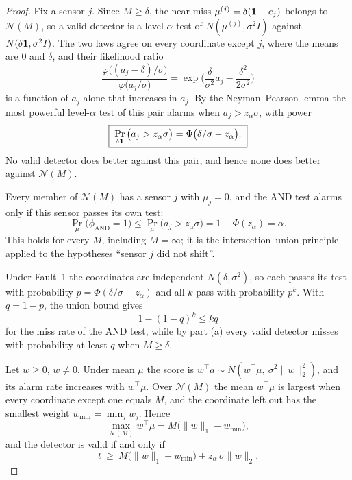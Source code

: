 \begin{proof}
 Fix a sensor $j$. Since $M\ge\delta$, the near-miss $\mu^{(j)}=\delta(\mathbf{1}-e_j)$ belongs to $\mathcal N(M)$, so a valid detector is a level-$\alpha$ test of $N(\mu^{(j)},\sigma^2I)$ against $N(\delta\mathbf{1},\sigma^2I)$. The two laws agree on every coordinate except $j$, where the means are $0$ and $\delta$, and their likelihood ratio
\begin{equation}\label{eq:nm-ratio}
  \frac{\varphi\big((a_j-\delta)/\sigma\big)}{\varphi\big(a_j/\sigma\big)}
  =\exp\Big(\frac{\delta}{\sigma^2}a_j-\frac{\delta^2}{2\sigma^2}\Big)
\end{equation}
is a function of $a_j$ alone that increases in $a_j$. By the Neyman--Pearson lemma the most powerful level-$\alpha$ test of this pair alarms when $a_j>z_\alpha\sigma$, with power
\begin{equation}\label{eq:ceiling}
  \boxed{\;\Pr_{\delta\mathbf{1}}\big(a_j>z_\alpha\sigma\big)=\Phi\big(\delta/\sigma-z_\alpha\big).\;}
\end{equation}
No valid detector does better against this pair, and hence none does better against $\mathcal N(M)$.

 Every member of $\mathcal N(M)$ has a sensor $j$ with $\mu_j=0$, and the AND test alarms only if this sensor passes its own test:
\begin{equation}\label{eq:and-valid}
  \boxed{\;\Pr_\mu\big(\phi_{\mathrm{AND}}=1\big)
  \le\Pr_\mu\big(a_j>z_\alpha\sigma\big)
  =1-\Phi(z_\alpha)=\alpha .\;}
\end{equation}
This holds for every $M$, including $M=\infty$; it is the intersection--union principle \citep{berger1982} applied to the hypotheses ``sensor $j$ did not shift''.

 Under Fault~1 the coordinates are independent $N(\delta,\sigma^2)$, so each passes its test with probability $p=\Phi(\delta/\sigma-z_\alpha)$ and all $k$ pass with probability $p^k$. With $q=1-p$, the union bound gives
\begin{equation}\label{eq:and-miss}
  1-(1-q)^k\le kq
\end{equation}
for the miss rate of the AND test, while by part (a) every valid detector misses with probability at least $q$ when $M\ge\delta$.

 Let $w\ge0$, $w\ne0$. Under mean $\mu$ the score is $w^\top a\sim N(w^\top\mu,\ \sigma^2\|w\|_2^2)$, and its alarm rate increases with $w^\top\mu$. Over $\mathcal N(M)$ the mean $w^\top\mu$ is largest when every coordinate except one equals $M$, and the coordinate left out has the smallest weight $w_{\min}=\min_jw_j$. Hence
\begin{equation}\label{eq:worst}
  \max_{\mathcal N(M)}w^\top\mu=M\big(\|w\|_1-w_{\min}\big),
\end{equation}
and the detector is valid if and only if
\begin{equation}\label{eq:valid-t}
  t\ \ge\ M\big(\|w\|_1-w_{\min}\big)+z_\alpha\,\sigma\|w\|_2 .
\end{equation}


\end{proof}
